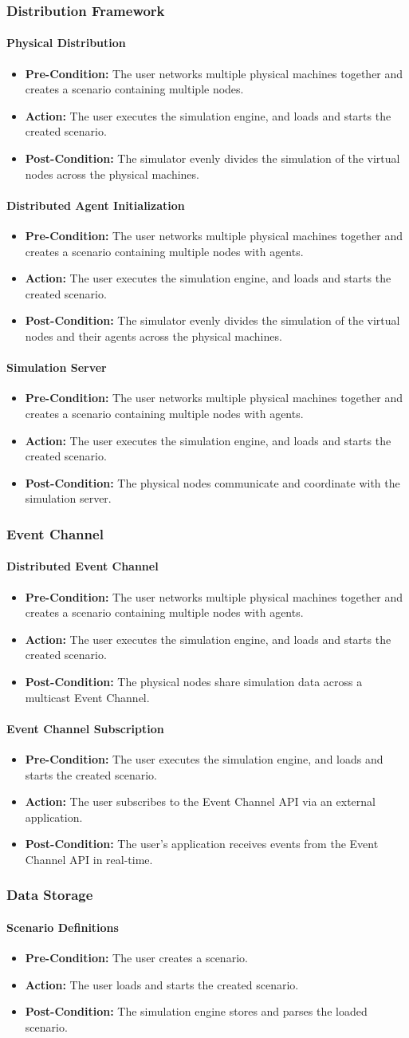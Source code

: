 \documentclass[titlepage]{article}
\newcommand{\testentry}[4]{
    \paragraph{#1}
    \begin{itemize}
        \item \textbf{Pre-Condition:} #2
        \item \textbf{Action:} #3
        \item \textbf{Post-Condition:} #4
    \end{itemize}
}
\begin{document}
\subsubsection{Distribution Framework}
    \testentry{Physical Distribution}{
        The user networks multiple physical machines together and creates a scenario containing multiple nodes.
    }{
        The user executes the simulation engine, and loads and starts the created scenario.
    }{
        The simulator evenly divides the simulation of the virtual nodes across the physical machines.
    }
    \testentry{Distributed Agent Initialization}{
        The user networks multiple physical machines together and creates a scenario containing multiple nodes with agents.
    }{
        The user executes the simulation engine, and loads and starts the created scenario.
    }{
        The simulator evenly divides the simulation of the virtual nodes and their agents across the physical machines.
    }
    \testentry{Simulation Server}{
        The user networks multiple physical machines together and creates a scenario containing multiple nodes with agents.
    }{
        The user executes the simulation engine, and loads and starts the created scenario.
    }{
        The physical nodes communicate and coordinate with the simulation server.
    }
    

\subsubsection{Event Channel}
    \testentry{Distributed Event Channel}{
        The user networks multiple physical machines together and creates a scenario containing multiple nodes with agents.
    }{
        The user executes the simulation engine, and loads and starts the created scenario.
    }{
        The physical nodes share simulation data across a multicast Event Channel.
    }
    \testentry{Event Channel Subscription}{
        The user executes the simulation engine, and loads and starts the created scenario.
    }{
        The user subscribes to the Event Channel API via an external application.
    }{
        The user's application receives events from the Event Channel API in real-time.
    }


\subsubsection{Data Storage%
  \label{data-storage}%
}
    \testentry{Scenario Definitions}{ 
        The user creates a scenario.
    }{
        The user loads and starts the created scenario.
    }{
        The simulation engine stores and parses the loaded scenario.
    }
\end{document}

